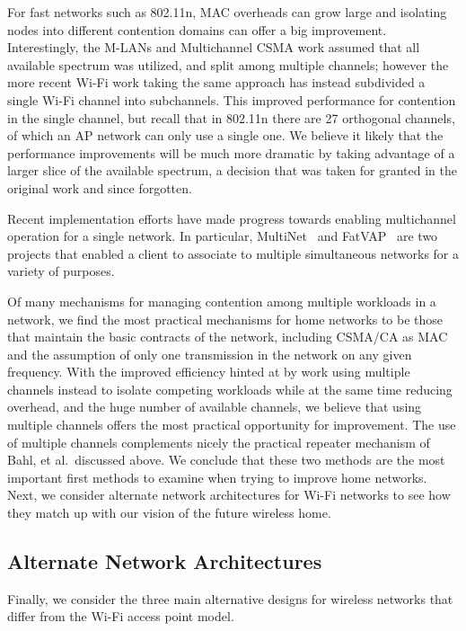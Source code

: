 For fast networks such as 802.11n, MAC overheads can grow large and isolating nodes into different contention domains can offer a big improvement. Interestingly, the M-LANs and Multichannel CSMA work assumed that all available spectrum was utilized, and split among multiple channels; however the more recent Wi-Fi work taking the same approach has instead subdivided a single Wi-Fi channel into subchannels. This improved performance for contention in the single channel, but recall that in 802.11n there are 27 orthogonal channels, of which an AP network can only use a single one. We believe it likely that the performance improvements will be much more dramatic by taking advantage of a larger slice of the available spectrum, a decision that was taken for granted in the original work and since forgotten.

Recent implementation efforts have made progress towards enabling multichannel operation for a single network. In particular,  MultiNet~\cite{chandra_multinet} and FatVAP~\cite{kandula_fatvap} are two projects that enabled a client to associate to multiple simultaneous networks for a variety of purposes. 

 Of many mechanisms for managing contention among multiple workloads in a network, we find the most practical mechanisms for home networks to be those that maintain the basic contracts of the network, including CSMA/CA as MAC and the assumption of only one transmission in the network on any given frequency. With the improved efficiency hinted at by work using multiple channels instead to isolate competing workloads while at the same time reducing overhead, and the huge number of available channels, we believe that using multiple channels offers the most practical opportunity for improvement. The use of multiple channels complements nicely the practical repeater mechanism of Bahl, et al.\ discussed above. We conclude that these two methods are the most important first methods to examine when trying to improve home networks. Next, we consider alternate network architectures for Wi-Fi networks to see how they match up with our vision of the future wireless home.

\subsection{Alternate Network Architectures}
Finally, we consider the three main alternative designs for wireless networks that differ from the Wi-Fi access point model.

